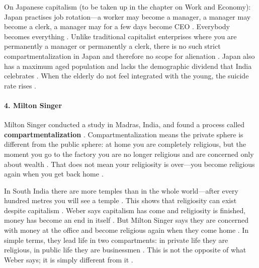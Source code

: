\begin{ExampleBox}
On Japanese capitalism (to be taken up in the chapter on Work and Economy): Japan practises job rotation---a worker may become a manager, a manager may become a clerk, a manager may for a few days become CEO . Everybody becomes everything .
Unlike traditional capitalist enterprises where you are permanently a manager or permanently a clerk, there is no such strict compartmentalization in Japan and therefore no scope for alienation .
Japan also has a maximum aged population and lacks the demographic dividend that India celebrates . When the elderly do not feel integrated with the young, the suicide rate rises .
\end{ExampleBox}

\paragraph{4. Milton Singer}
Milton Singer conducted a study in Madras, India, and found a process called \textbf{compartmentalization} .
Compartmentalization means the private sphere is different from the public sphere: at home you are completely religious, but the moment you go to the factory you are no longer religious and are concerned only about wealth . That does not mean your religiosity is over---you become religious again when you get back home .

In South India there are more temples than in the whole world---after every hundred metres you will see a temple . This shows that religiosity can exist despite capitalism .
Weber says capitalism has come and religiosity is finished, money has become an end in itself . But Milton Singer says they are concerned with money at the office and become religious again when they come home .
In simple terms, they lead life in two compartments: in private life they are religious, in public life they are businessmen . This is not the opposite of what Weber says; it is simply different from it .

